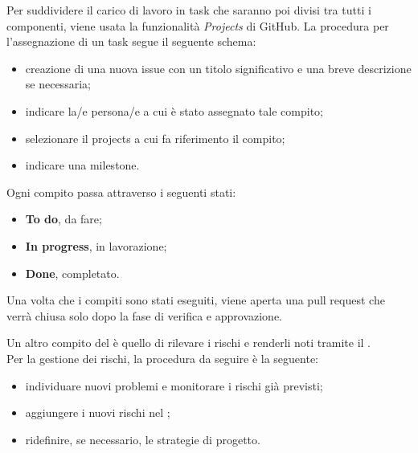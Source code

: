 Per suddividere il carico di lavoro in task che saranno poi divisi tra tutti i componenti, viene usata la funzionalità \textit{Projects} di GitHub. La procedura per l'assegnazione di un task segue il seguente schema:
\begin{itemize}
\item creazione di una nuova issue con un titolo significativo e una breve descrizione se necessaria;
\item indicare la/e persona/e a cui è stato assegnato tale compito;
\item selezionare il projects a cui fa riferimento il compito;
\item indicare una milestone.
\end{itemize}
Ogni compito passa attraverso i seguenti stati:
\begin{itemize}
\item \textbf{To do}, da fare;
\item \textbf{In progress}, in lavorazione;
\item \textbf{Done}, completato.
\end{itemize}
Una volta che i compiti sono stati eseguiti, viene aperta una pull request che verrà chiusa solo dopo la fase di verifica e approvazione.

Un altro compito del \respProg{} è quello di rilevare i rischi e renderli noti tramite il \PdP. \\
Per la gestione dei rischi, la procedura da seguire è la seguente:
\begin{itemize}
\item individuare nuovi problemi e monitorare i rischi già previsti;
\item aggiungere i nuovi rischi nel \PdP;
\item ridefinire, se necessario, le strategie di progetto.
\end{itemize}